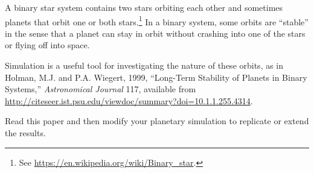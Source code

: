 \documentclass[
]{book}
\begin{document}
\begin{ex}
\label{ex:binary}

A binary star system contains two stars orbiting each other and
sometimes planets that orbit one or both stars.\footnote{See
\url{https://en.wikipedia.org/wiki/Binary_star}.}  In a binary
system, some orbits are ``stable'' in the sense that a planet can stay
in orbit without crashing into one of the stars or flying off into
space.

Simulation is a useful tool for investigating the nature of these
orbits, as in Holman, M.J. and P.A. Wiegert, 1999, ``Long-Term Stability
of Planets in Binary Systems,''  {\em Astronomical Journal} 117,
available from \url{http://citeseer.ist.psu.edu/viewdoc/summary?doi=10.1.1.255.4314}.

Read this paper and then modify your planetary simulation to
replicate or extend the results.
\end{ex}
\end{document}
